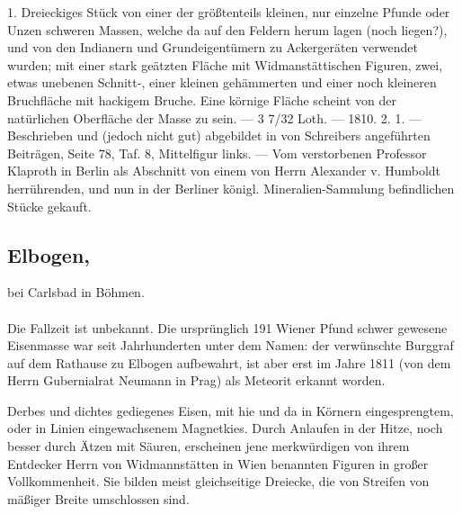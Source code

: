 \documentclass[a4paper, 11pt, oneside, polutonikogreek, german]{article}
\begin{document}
1. Dreieckiges Stück von einer der größtenteils kleinen, nur einzelne Pfunde oder Unzen schweren Massen, welche da auf den Feldern herum lagen (noch liegen?), und von den Indianern und Grundeigentümern zu Ackergeräten verwendet wurden; mit einer stark geätzten Fläche mit Widmanstättischen Figuren, zwei, etwas unebenen Schnitt-, einer kleinen gehämmerten und einer noch kleineren Bruchfläche mit hackigem Bruche. Eine körnige Fläche scheint von der natürlichen Oberfläche der Masse zu sein. — 3 7/32 Loth. — 1810. 2. 1. — Beschrieben und (jedoch nicht gut) abgebildet in von Schreibers angeführten Beiträgen, Seite 78, Taf. 8, Mittelfigur links. — Vom verstorbenen Professor Klaproth in Berlin als Abschnitt von einem von Herrn Alexander v. Humboldt herrührenden, und nun in der Berliner königl. Mineralien-Sammlung befindlichen Stücke gekauft.
\subsection[Elbogen.]{Elbogen,}
\begin{center}
\small
bei Carlsbad in Böhmen.
\end{center}
\paragraph{}
Die Fallzeit ist unbekannt. Die ursprünglich 191 Wiener Pfund schwer gewesene Eisenmasse war seit Jahrhunderten unter dem Namen: der verwünschte Burggraf auf dem Rathause zu Elbogen aufbewahrt, ist aber erst im Jahre 1811 (von dem Herrn Gubernialrat Neumann in Prag) als Meteorit erkannt worden.

Derbes und dichtes gediegenes Eisen, mit hie und da in Körnern eingesprengtem, oder in Linien eingewachsenem Magnetkies. Durch Anlaufen in der Hitze, noch besser durch Ätzen mit Säuren, erscheinen jene merkwürdigen von ihrem Entdecker Herrn von Widmannstätten in Wien benannten Figuren in großer Vollkommenheit. Sie bilden meist gleichseitige Dreiecke, die von Streifen von mäßiger Breite umschlossen sind.
\end{document}
